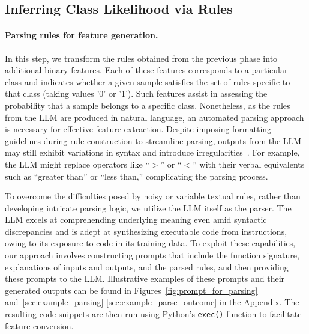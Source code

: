 \subsection{Inferring Class Likelihood via Rules}
\label{Sec:training}

\paragraph{Parsing rules for feature generation.} In this step, we transform the rules obtained from the previous phase into additional binary features. Each of these features corresponds to a particular class and indicates whether a given sample satisfies the set of rules specific to that class (taking values '0' or '1'). Such features assist in assessing the probability that a sample belongs to a specific class. Nonetheless, as the rules from the LLM are produced in natural language, an automated parsing approach is necessary for effective feature extraction. Despite imposing formatting guidelines during rule construction to streamline parsing, outputs from the LLM may still exhibit variations in syntax and introduce irregularities~\cite{kovavc2023large}. For example, the LLM might replace operators like ``$>$” or ``$<$” with their verbal equivalents such as ``greater than'' or ``less than,'' complicating the parsing process.

To overcome the difficulties posed by noisy or variable textual rules, rather than developing intricate parsing logic, we utilize the LLM itself as the parser. The LLM excels at comprehending underlying meaning even amid syntactic discrepancies and is adept at synthesizing executable code from instructions, owing to its exposure to code in its training data. To exploit these capabilities, our approach involves constructing prompts that include the function signature, explanations of inputs and outputs, and the parsed rules, and then providing these prompts to the LLM. Illustrative examples of these prompts and their generated outputs can be found in Figures~\ref{fig:prompt_for_parsing} and~\ref{sec:example_parsing}-\ref{sec:example_parse_outcome} in the Appendix. The resulting code snippets are then run using Python's \texttt{exec()} function to facilitate feature conversion.

\vspace*{-0.12in}
